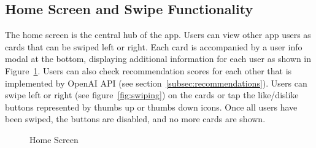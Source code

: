 \subsection{Home Screen and Swipe Functionality}
The home screen is the central hub of the app. Users can view other app users as cards that can be swiped left or right. Each card is accompanied by a user info modal at the bottom, displaying additional information for each user as shown in Figure~\ref{fig:home-screen}. Users can also check recommendation scores for each other that is implemented by OpenAI API (see section~\ref{subsec:recommendations}). Users can swipe left or right (see figure~\ref{fig:swiping}) on the cards or tap the like/dislike buttons represented by thumbs up or thumbs down icons. Once all users have been swiped, the buttons are disabled, and no more cards are shown. 
 \begin{figure}[H]
	\centering
	\hspace{5pt}
	\caption{Home Screen}
	\label{fig:home-screen}
\end{figure}
